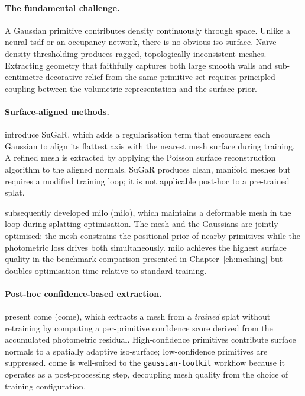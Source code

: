 \paragraph{The fundamental challenge.}
A Gaussian primitive contributes density continuously through space. Unlike a
neural \acrshort{tsdf} or an occupancy network, there is no obvious iso-surface.
Na\"{i}ve density thresholding produces ragged, topologically inconsistent meshes.
Extracting geometry that faithfully captures both large smooth walls and sub-centimetre
decorative relief from the same primitive set requires principled coupling between
the volumetric representation and the surface prior.

\paragraph{Surface-aligned methods.}
\textcite{Guedon2024Sugar} introduce SuGaR, which adds a regularisation term that
encourages each Gaussian to align its flattest axis with the nearest mesh surface
during training. A refined mesh is extracted by applying the Poisson surface
reconstruction algorithm to the aligned normals. SuGaR produces clean, manifold
meshes but requires a modified training loop; it is not applicable post-hoc to a
pre-trained splat.

\textcite{Guedon2025MILo} subsequently developed \acrlong{milo} (\acrshort{milo}),
which maintains a deformable mesh in the loop during splatting optimisation. The
mesh and the Gaussians are jointly optimised: the mesh constrains the positional
prior of nearby primitives while the photometric loss drives both simultaneously.
\acrshort{milo} achieves the highest surface quality in the benchmark comparison
presented in Chapter~\ref{ch:meshing} but doubles optimisation time relative to
standard training.

\paragraph{Post-hoc confidence-based extraction.}
\textcite{Radl2025CoMe} present \acrlong{come} (\acrshort{come}), which extracts
a mesh from a \emph{trained} splat without retraining by computing a per-primitive
confidence score derived from the accumulated photometric residual. High-confidence
primitives contribute surface normals to a spatially adaptive iso-surface;
low-confidence primitives are suppressed. \acrshort{come} is well-suited to the
\texttt{gaussian-toolkit} workflow because it operates as a post-processing step,
decoupling mesh quality from the choice of training configuration.

